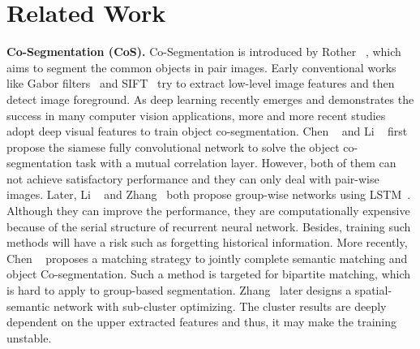 \documentclass[journal]{IEEEtran}
\begin{document}
\section{Related Work}
\label{sec:rela}
\textbf{Co-Segmentation (CoS).} 
Co-Segmentation is introduced by Rother ~\cite{rother2006cosegmentation}, which aims to segment the common objects in pair images. Early conventional works like Gabor filters~\cite{hochbaum2009efficient} and SIFT~\cite{rubinstein2013unsupervised} try to extract low-level image features and then detect image foreground. As deep learning recently emerges and demonstrates the success in many computer vision applications, more and more recent studies 
adopt deep visual features to train object co-segmentation. Chen ~\cite{chen2018semantic} and Li ~\cite{li2018deep} first propose the siamese fully convolutional  network to solve the object co-segmentation task with a mutual correlation layer. However, both of them can not achieve satisfactory performance and they can only deal with pair-wise images.
Later, Li ~\cite{li2019group} and Zhang~\cite{zhang2021cyclesegnet}  both propose group-wise networks using LSTM~\cite{hochreiter1997long}. Although they can improve the performance, they are computationally expensive because of the serial structure of recurrent neural network. Besides, training such methods will have a risk such as forgetting historical information. More recently, Chen ~\cite{chen2020show} proposes a matching strategy to jointly complete semantic matching and object Co-segmentation. Such a method is targeted for bipartite matching, which is hard to apply to group-based segmentation. Zhang~\cite{zhang2020deep} later designs a spatial-semantic network with sub-cluster optimizing. The cluster 
results are deeply dependent on the upper extracted features and thus, it may make the training unstable.

\vspace{1ex}
\end{document}
